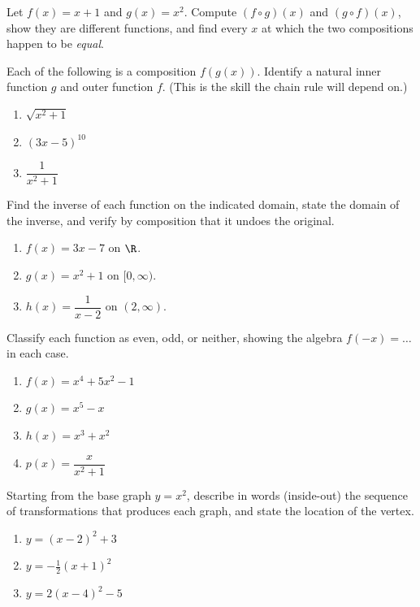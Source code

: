 \begin{exercise}
\label{ch02:exc-composition}
Let $f(x) = x + 1$ and $g(x) = x^2$. Compute $(f\circ g)(x)$ and $(g\circ f)(x)$,
show they are different functions, and find every $x$ at which the two compositions
happen to be \emph{equal}.
\end{exercise}

\begin{exercise}
\label{ch02:exc-decompose}
Each of the following is a composition $f(g(x))$. Identify a natural inner function
$g$ and outer function $f$. (This is the skill the chain rule will depend on.)
\begin{enumerate}
  \item $\sqrt{x^2 + 1}$
  \item $(3x - 5)^{10}$
  \item $\dfrac{1}{x^2 + 1}$
\end{enumerate}
\end{exercise}

\begin{exercise}
\label{ch02:exc-inverses}
Find the inverse of each function on the indicated domain, state the domain of the
inverse, and verify by composition that it undoes the original.
\begin{enumerate}
  \item $f(x) = 3x - 7$ on $\R$.
  \item $g(x) = x^2 + 1$ on $[0, \infty)$.
  \item $h(x) = \dfrac{1}{x - 2}$ on $(2, \infty)$.
\end{enumerate}
\end{exercise}

\begin{exercise}
\label{ch02:exc-even-odd}
Classify each function as even, odd, or neither, showing the algebra
$f(-x) = \ldots$ in each case.
\begin{enumerate}
  \item $f(x) = x^4 + 5x^2 - 1$
  \item $g(x) = x^5 - x$
  \item $h(x) = x^3 + x^2$
  \item $p(x) = \dfrac{x}{x^2 + 1}$
\end{enumerate}
\end{exercise}

\begin{exercise}[Transformations]
\label{ch02:exc-transform}
Starting from the base graph $y = x^2$, describe in words (inside-out) the sequence
of transformations that produces each graph, and state the location of the vertex.
\begin{enumerate}
  \item $y = (x - 2)^2 + 3$
  \item $y = -\tfrac{1}{2}(x + 1)^2$
  \item $y = 2(x - 4)^2 - 5$
\end{enumerate}
\end{exercise}

